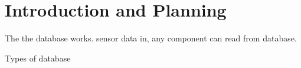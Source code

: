 \section{Introduction and Planning}


The the database works. sensor data in, any component can read from database.

Types of database
